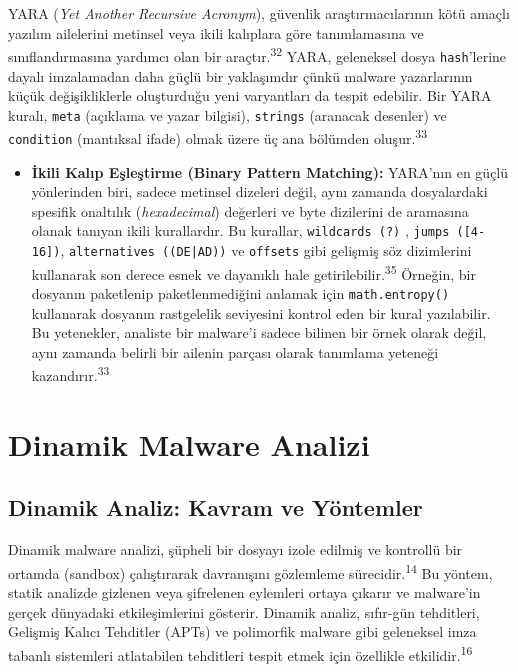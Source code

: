 YARA (\textit{Yet Another Recursive Acronym}), güvenlik araştırmacılarının kötü amaçlı yazılım ailelerini metinsel veya ikili kalıplara göre tanımlamasına ve sınıflandırmasına yardımcı olan bir araçtır.\textsuperscript{32} YARA, geleneksel dosya \texttt{hash}'lerine dayalı imzalamadan daha güçlü bir yaklaşımdır çünkü malware yazarlarının küçük değişikliklerle oluşturduğu yeni varyantları da tespit edebilir. Bir YARA kuralı, \texttt{meta} (açıklama ve yazar bilgisi), \texttt{strings} (aranacak desenler) ve \texttt{condition} (mantıksal ifade) olmak üzere üç ana bölümden oluşur.\textsuperscript{33}

\begin{itemize}
    \item \textbf{İkili Kalıp Eşleştirme (Binary Pattern Matching):} YARA'nın en güçlü yönlerinden biri, sadece metinsel dizeleri değil, aynı zamanda dosyalardaki spesifik onaltılık (\textit{hexadecimal}) değerleri ve byte dizilerini de aramasına olanak tanıyan ikili kurallardır. Bu kurallar, \texttt{wildcards (?)} , \texttt{jumps ([4-16])}, \texttt{alternatives ((DE|AD))} ve \texttt{offsets} gibi gelişmiş söz dizimlerini kullanarak son derece esnek ve dayanıklı hale getirilebilir.\textsuperscript{35} Örneğin, bir dosyanın paketlenip paketlenmediğini anlamak için \texttt{math.entropy()} kullanarak dosyanın rastgelelik seviyesini kontrol eden bir kural yazılabilir. Bu yetenekler, analiste bir malware'i sadece bilinen bir örnek olarak değil, aynı zamanda belirli bir ailenin parçası olarak tanımlama yeteneği kazandırır.\textsuperscript{33}
\end{itemize}

\section{Dinamik Malware Analizi}

\subsection{Dinamik Analiz: Kavram ve Yöntemler}

Dinamik malware analizi, şüpheli bir dosyayı izole edilmiş ve kontrollü bir ortamda (sandbox) çalıştırarak davranışını gözlemleme sürecidir.\textsuperscript{14} Bu yöntem, statik analizde gizlenen veya şifrelenen eylemleri ortaya çıkarır ve malware'in gerçek dünyadaki etkileşimlerini gösterir. Dinamik analiz, sıfır-gün tehditleri, Gelişmiş Kalıcı Tehditler (APTs) ve polimorfik malware gibi geleneksel imza tabanlı sistemleri atlatabilen tehditleri tespit etmek için özellikle etkilidir.\textsuperscript{16}

